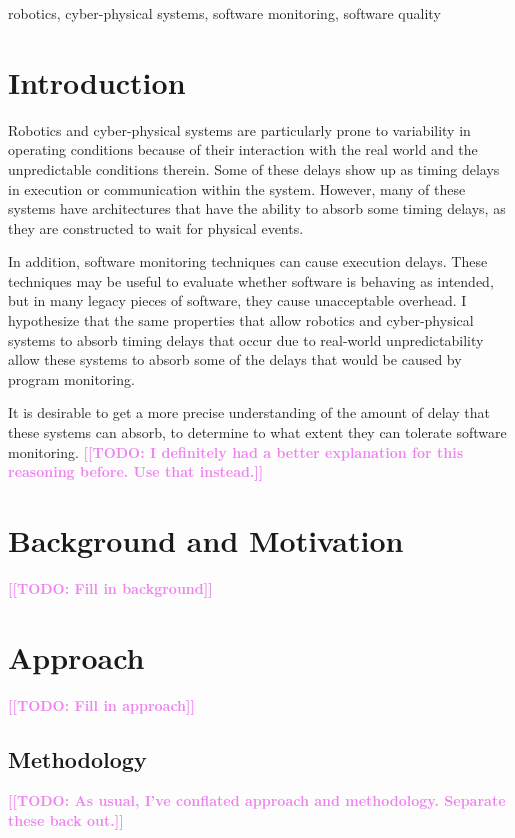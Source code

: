 \documentclass[conference]{IEEEtran}
\newcommand{\todo}[1]{\textcolor{violet}{{\bfseries [[TODO: #1]]}}}
\begin{document}
\begin{IEEEkeywords}
robotics, cyber-physical systems, software monitoring, software quality
\end{IEEEkeywords}

\section{Introduction}
Robotics and cyber-physical systems are particularly prone to variability in operating conditions because of their interaction with the real world and the unpredictable conditions therein. Some of these delays show up as timing delays in execution or communication within the system. However, many of these systems have architectures that have the ability to absorb some timing delays, as they are constructed to wait for physical events.

In addition, software monitoring techniques can cause execution delays. These techniques may be useful to evaluate whether software is behaving as intended, but in many legacy pieces of software, they cause unacceptable overhead. I hypothesize that the same properties that allow robotics and cyber-physical systems to absorb timing delays that occur due to real-world unpredictability allow these systems to absorb some of the delays that would be caused by program monitoring.

It is desirable to get a more precise understanding of the amount of delay that these systems can absorb, to determine to what extent they can tolerate software monitoring. 
\todo{I definitely had a better explanation for this reasoning before. Use that instead.}

\section{Background and Motivation}
\label{sec:background}
\todo{Fill in background}

\section{Approach}
\label{sec:approach}
\todo{Fill in approach}


\subsection{Methodology}
\label{sec:methodology}
\todo{As usual, I've conflated approach and methodology. Separate these back out.}
\end{document}
